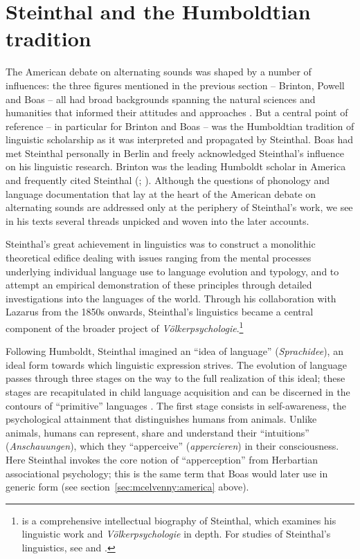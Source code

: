 \documentclass[output=paper]{langscibook}
\begin{document}
\section{Steinthal and the Humboldtian tradition}
\label{sec:mcelvenny:humboldtian}

The American debate on alternating sounds was shaped by a number of influences: the three figures mentioned in the previous section -- Brinton, Powell and Boas -- all had broad backgrounds spanning the natural sciences and humanities that informed their attitudes and approaches \citep[see][]{Darnell1998}. But a central point of reference -- in particular for Brinton and Boas -- was the Humboldtian tradition of linguistic scholarship as it was interpreted and propagated by Steinthal. Boas had met Steinthal personally in Berlin and freely acknowledged Steinthal's influence on his linguistic research. Brinton was the leading Humboldt scholar in America and frequently cited Steinthal (\citealt[see][63--69]{Bunzl1996}; \citealt[289--292]{TrautmannWaller2006}). Although the questions of phonology and language documentation that lay at the heart of the American debate on alternating sounds are addressed only at the periphery of Steinthal's work, we see in his texts several threads unpicked and woven into the later accounts.

Steinthal's great achievement in linguistics was to construct a monolithic theoretical edifice dealing with issues ranging from the mental processes underlying individual language use to language evolution and typology, and to attempt an empirical demonstration of these principles through detailed investigations into the languages of the world. Through his collaboration with Lazarus from the 1850s onwards, Steinthal's linguistics became a central component of the broader project of \emph{Völkerpsychologie}.\footnote{\citet{TrautmannWaller2006} is a comprehensive intellectual biography of Steinthal, which examines his linguistic work and \emph{Völkerpsychologie} in depth. For studies of Steinthal's linguistics, see \citet{Bumann1965} and \citet{Ringmacher1996}.} 

Following Humboldt, Steinthal imagined an ``idea of language'' (\emph{Sprachidee}), an ideal form towards which linguistic expression strives. The evolution of language passes through three stages on the way to the full realization of this ideal; these stages are recapitulated in child language acquisition and can be discerned in the contours of ``primitive'' languages \citep[cf.][81--93]{Bumann1965}. The first stage consists in self-awareness, the psychological attainment that distinguishes humans from animals. Unlike animals, humans can represent, share and understand their ``intuitions'' (\emph{Anschauungen}), which they ``apperceive'' (\emph{appercieren}) in their consciousness. Here Steinthal invokes the core notion of ``apperception'' from Herbartian associational psychology; this is the same term that Boas would later use in generic form (see section~\ref{sec:mcelvenny:america} above). 
\end{document}
